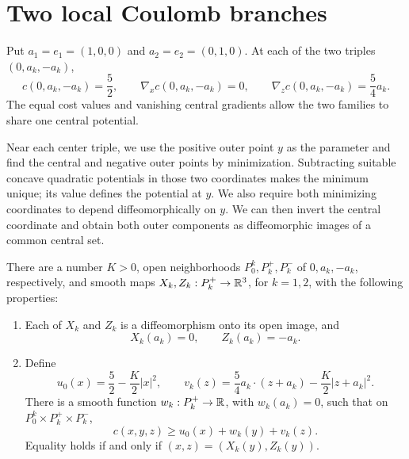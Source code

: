 \section{Two local Coulomb branches}\label{sec:local}

Put \(a_1=e_1=(1,0,0)\) and \(a_2=e_2=(0,1,0)\).
At each of the two triples \((0,a_k,-a_k)\),
\begin{equation}\label{eq:center-jets}
 c(0,a_k,-a_k)=\frac52,\qquad
 \nabla_xc(0,a_k,-a_k)=0,\qquad
 \nabla_zc(0,a_k,-a_k)=\frac54a_k.
\end{equation}
The equal cost values and vanishing central gradients allow the two
families to share one central potential.

Near each center triple, we use the positive outer point \(y\) as the parameter and find
the central and negative outer points by minimization. Subtracting
suitable concave quadratic potentials in those two coordinates makes
the minimum unique; its value defines the potential at \(y\).
We also require both minimizing coordinates to depend diffeomorphically
on \(y\). We can then invert the central coordinate and obtain both
outer components as diffeomorphic images of a common central set.

\begin{lemma}\label{lem:local}
There are a number \(K>0\), open neighborhoods \(P_0^k,P_k^+,P_k^-\)
of \(0,a_k,-a_k\), respectively, and smooth maps
\(X_k,Z_k:P_k^+\to\mathbb R^3\), for \(k=1,2\), with the following
properties:
\begin{enumerate}
 \item Each of \(X_k\) and \(Z_k\) is a diffeomorphism onto its
 open image, and
 \[
  X_k(a_k)=0,\qquad Z_k(a_k)=-a_k.
 \]
 \item Define
 \[
 u_0(x)=\frac52-\frac K2|x|^2,\qquad
 v_k(z)=\frac54a_k\cdot(z+a_k)-\frac K2|z+a_k|^2.
 \]
 There is a smooth function \(w_k:P_k^+\to\mathbb R\), with
 \(w_k(a_k)=0\), such that on
 \(P_0^k\times P_k^+\times P_k^-\),
 \begin{equation}\label{eq:local-certificate}
 c(x,y,z)\ge u_0(x)+w_k(y)+v_k(z).
 \end{equation}
 Equality holds if and only if
 \((x,z)=(X_k(y),Z_k(y))\).
\end{enumerate}
\end{lemma}


